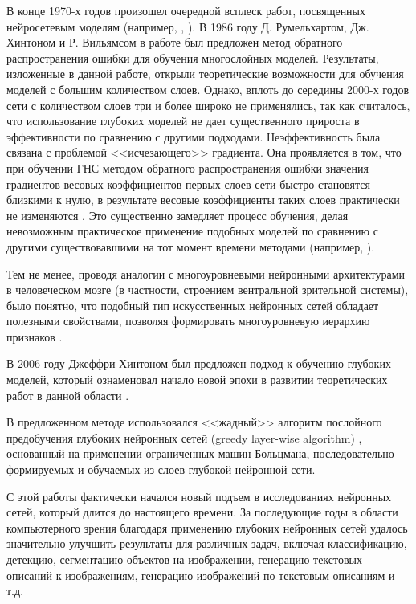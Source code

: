 В конце 1970-х годов произошел очередной всплеск работ, посвященных нейросетевым моделям (например, \cite{Grossberg1976}, \cite{Kohonen1977}).
В 1986 году Д. Румельхартом, Дж. Хинтоном и Р. Вильямсом в работе \cite{rumelhart1986learning} был предложен метод обратного распространения ошибки для обучения многослойных моделей. Результаты, изложенные в данной работе, открыли теоретические возможности для обучения моделей с большим количеством слоев.  Однако, вплоть до середины 2000-х годов сети с количеством слоев три и более широко не применялись, так как считалось, что использование глубоких моделей не дает существенного прироста в эффективности по сравнению с другими подходами. Неэффективность была связана с проблемой <<исчезающего>> градиента. Она проявляется в том, что при обучении ГНС методом обратного распространения ошибки значения градиентов весовых коэффициентов первых слоев сети быстро становятся близкими к нулю, в результате весовые коэффициенты таких слоев практически не изменяются \cite{n5}. Это существенно замедляет процесс обучения, делая невозможным практическое применение подобных моделей по сравнению с другими существовавшими на тот момент времени методами (например, \cite{Corinna1995}).

Тем не менее, проводя аналогии с многоуровневыми нейронными архитектурами в человеческом мозге (в частности, строением вентральной зрительной системы), было понятно, что подобный тип искусственных нейронных сетей обладает полезными свойствами, позволяя формировать многоуровневую иерархию признаков \cite{Behnke2003}.

В 2006 году Джеффри Хинтоном был предложен подход к обучению глубоких моделей, который ознаменовал начало новой эпохи в развитии теоретических работ в данной области \cite{n1}.

В предложенном методе использовался <<жадный>> алгоритм послойного предобучения глубоких нейронных сетей (greedy layer-wise algorithm) \cite{Hinton2009}, основанный на применении ограниченных машин Больцмана, последовательно формируемых и обучаемых из слоев глубокой нейронной сети. 

С этой работы фактически начался новый подъем в исследованиях нейронных сетей, который длится до настоящего времени. За последующие годы в области компьютерного зрения благодаря применению глубоких нейронных сетей удалось значительно улучшить результаты для различных задач, включая классификацию, детекцию, сегментацию объектов на изображении, генерацию текстовых описаний к изображениям, генерацию изображений по текстовым описаниям и т.д.  %

